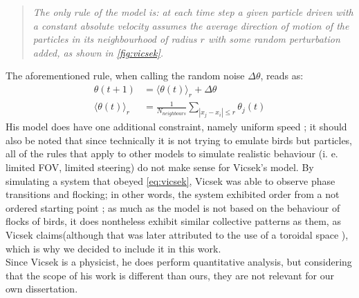 \begin{quote}
    \textit{The only rule of the model is: at each time step a given particle driven with a constant absolute velocity assumes the average direction of motion of the particles in its
        neighbourhood of radius $r$ with some random perturbation added, as shown in \autoref{fig:vicsek}.} \cite{vicsek}
\end{quote}
The aforementioned rule, when calling the random noise $\Delta\theta$, reads as:
\begin{equation}
    \label{eq:vicsek}
    \begin{split}
        \theta(t + 1)             & = \langle\theta(t)\rangle_r + \Delta\theta                      \\
        \langle\theta(t)\rangle_r & = \frac{1}{N_{neighbours}} \sum_{|x_j - x_i| \le r} \theta_j(t)
    \end{split}
\end{equation}
His model does have one additional constraint, namely uniform speed \cite{vicsek_manual}; it should also be noted that since technically it is not trying to emulate birds but particles, all of the rules that apply to other models to simulate realistic behaviour (i. e. limited FOV, limited steering) do not make sense for Vicsek's model.
By simulating a system that obeyed \autoref{eq:vicsek}, Vicsek was able to observe phase transitions and flocking; in other words, the system exhibited order from a not ordered starting point \cite{vicsek}; as much as the model is not based on the behaviour of flocks of birds, it does nontheless exhibit similar collective patterns as them, as Vicsek claims(although that was later attributed to the use of  a toroidal space \cite{chate}), which is why we decided to include it in this work. \\
Since Vicsek is a physicist, he does perform quantitative analysis, but considering that the scope of his work is different than ours, they are not relevant for our own dissertation.
